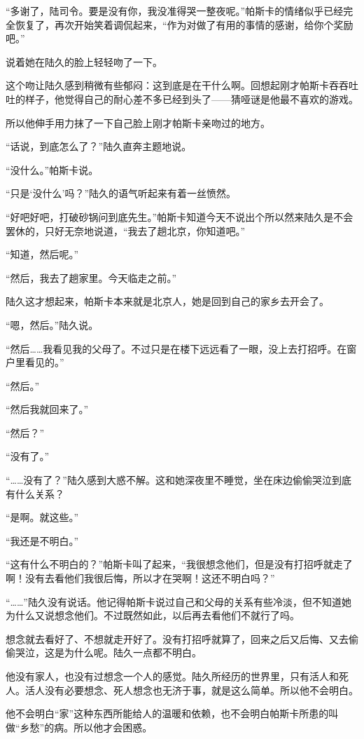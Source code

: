 “多谢了，陆司令。要是没有你，我没准得哭一整夜呢。”帕斯卡的情绪似乎已经完全恢复了，再次开始笑着调侃起来，“作为对做了有用的事情的感谢，给你个奖励吧。”

说着她在陆久的脸上轻轻吻了一下。

这个吻让陆久感到稍微有些郁闷：这到底是在干什么啊。回想起刚才帕斯卡吞吞吐吐的样子，他觉得自己的耐心差不多已经到头了——猜哑谜是他最不喜欢的游戏。

所以他伸手用力抹了一下自己脸上刚才帕斯卡亲吻过的地方。

“话说，到底怎么了？”陆久直奔主题地说。

“没什么。”帕斯卡说。

“只是‘没什么’吗？”陆久的语气听起来有着一丝愤然。

“好吧好吧，打破砂锅问到底先生。”帕斯卡知道今天不说出个所以然来陆久是不会罢休的，只好无奈地说道，“我去了趟北京，你知道吧。”

“知道，然后呢。”

“然后，我去了趟家里。今天临走之前。”

陆久这才想起来，帕斯卡本来就是北京人，她是回到自己的家乡去开会了。

“嗯，然后。”陆久说。

“然后……我看见我的父母了。不过只是在楼下远远看了一眼，没上去打招呼。在窗户里看见的。”

“然后。”

“然后我就回来了。”

“然后？”

“没有了。”

“……没有了？”陆久感到大惑不解。这和她深夜里不睡觉，坐在床边偷偷哭泣到底有什么关系？

“是啊。就这些。”

“我还是不明白。”

“这有什么不明白的？”帕斯卡叫了起来，“我很想念他们，但是没有打招呼就走了啊！没有去看他们我很后悔，所以才在哭啊！这还不明白吗？”

“……”陆久没有说话。他记得帕斯卡说过自己和父母的关系有些冷淡，但不知道她为什么又说想念他们。不过既然如此，以后再去看他们不就行了吗。

想念就去看好了、不想就走开好了。没有打招呼就算了，回来之后又后悔、又去偷偷哭泣，这是为什么呢。陆久一点都不明白。

他没有家人，也没有过想念一个人的感觉。陆久所经历的世界里，只有活人和死人。活人没有必要想念、死人想念也无济于事，就是这么简单。所以他不会明白。

他不会明白“家”这种东西所能给人的温暖和依赖，也不会明白帕斯卡所患的叫做“乡愁”的病。所以他才会困惑。

